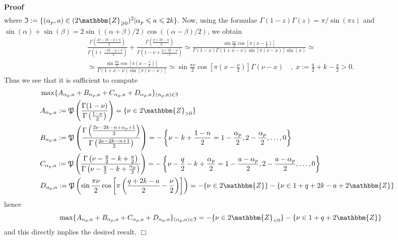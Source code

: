 \documentclass[12pt]{article}
\newcommand{\assign}{:=}
\renewenvironment{proof}{\noindent\textbf{Proof\ }}{\hspace*{\fill}$\Box$\medskip}
\theoremstyle{remark}
\begin{document}
\begin{proof}
\begin{eqnarray}
    \nonumber
  \end{eqnarray}
  where $\mathfrak{I} \assign \{ (\alpha_p, a) \in (2\mathbbm{Z}_{\geqslant
  0})^2 | \alpha_p \leqslant a \leqslant 2 k \}$. Now, using the formulae
  $\Gamma (1 - z) \Gamma (z) = \pi / \sin (\pi z)$ and $\sin (\alpha) + \sin
  (\beta) = 2 \sin ((\alpha + \beta) / 2) \cos ((\alpha - \beta) / 2)$, we
  obtain
  \begin{eqnarray}
    & \frac{\Gamma \left( \frac{2 \nu - 2 k - q + a}{2} \right)}{\Gamma
    \left( 1 + \frac{- 2 k - q + a}{2} \right)} + \frac{\Gamma \left( \frac{q
    + 2 k - a}{2} \right)}{\Gamma \left( 1 - \nu + \frac{q + 2 k - a}{2}
    \right)} \simeq \frac{\sin \frac{\pi \nu}{2} \cos \left[ \pi \left( x -
    \frac{\nu}{2} \right) \right]}{\Gamma (1 - x) \Gamma (1 + x - \nu) \sin
    [\pi (\nu - x)] \sin (x)} \simeq &  \nonumber\\
    & \simeq \frac{\sin \frac{\pi \nu}{2} \cos \left[ \pi \left( x -
    \frac{\nu}{2} \right) \right]}{\Gamma (1 + x - \nu) \sin [\pi (\nu - x)]}
    \simeq \sin \frac{\pi \nu}{2} \cos \left[ \pi \left( x - \frac{\nu}{2}
    \right) \right] \Gamma (\nu - x) \quad, \; x \assign \frac{q}{2} + k -
    \frac{a}{2} > 0. &  \nonumber
  \end{eqnarray}
  Thus we see that it is sufficient to compute
  \begin{eqnarray}
    & \max \{ A_{\alpha_p, a} + B_{\alpha_p, a} + C_{\alpha_p, a} +
    D_{\alpha_p, a} \}_{(\alpha_p, a) \in \mathfrak{I}} &  \nonumber\\
    & A_{\alpha_p, a} \assign \mathfrak{P} \left( \frac{\Gamma (1 -
    \nu)}{\Gamma \left( \frac{1 - \nu}{2} \right)} \right) = \{ \nu \in
    2\mathbbm{Z}_{> 0} \} &  \nonumber\\
    & B_{\alpha_p, a} \assign \mathfrak{P} \left( \frac{\Gamma \left( \frac{2
    \nu - 2 k - n + \alpha_p + 1}{2} \right)}{\Gamma \left( \frac{2 \nu - 2 k
    - n + 1}{2} \right)} \right) = - \left\{ \nu - k + \frac{1 - n}{2} = 1 -
    \frac{\alpha_p}{2}, 2 - \frac{\alpha_p}{2}, \ldots, 0 \right\} & 
    \nonumber\\
    & C_{\alpha_p, a} \assign \mathfrak{P} \left( \frac{\Gamma \left( \nu -
    \frac{q}{2} - k + \frac{a}{2} \right)}{\Gamma \left( \nu - \frac{q}{2} - k
    + \frac{\alpha_p}{2} \right)} \right) = - \left\{ \nu - \frac{q}{2} - k +
    \frac{\alpha_p}{2} = 1 - \frac{a - \alpha_p}{2}, 2 - \frac{a -
    \alpha_p}{2}, \ldots, 0 \right\} &  \nonumber\\
    & D_{\alpha_p, a} \assign \mathfrak{P} \left( \sin \frac{\pi \nu}{2} \cos
    \left[ \pi \left( \frac{q + 2 k - a}{2} - \frac{\nu}{2} \right) \right]
    \right) = - \{ \nu \in 2\mathbbm{Z} \} - \{ \nu \in 1 + q + 2 k - a +
    2\mathbbm{Z} \} &  \nonumber
  \end{eqnarray}
  hence
  \[ \max \{ A_{\alpha_p, a} + B_{\alpha_p, a} + C_{\alpha_p, a} +
     D_{\alpha_p, a} \}_{(\alpha_p, a) \in \mathfrak{I}} = - \{ \nu \in
     2\mathbbm{Z}_{< 0} \} - \{ \nu \in 1 + q + 2\mathbbm{Z} \} \]
  and this directly implies the desired result.
\end{proof}
\end{document}
